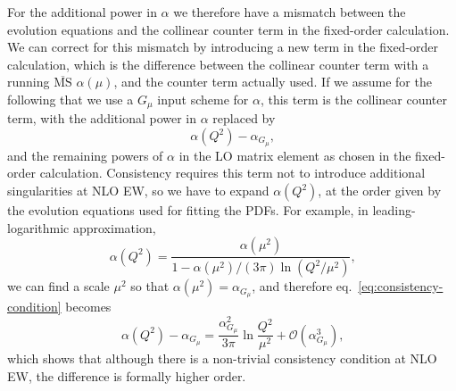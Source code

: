 For the additional power in $\alpha$ we therefore have a mismatch between the evolution equations and the collinear counter term in the fixed-order calculation.
We can correct for this mismatch by introducing a new term in the fixed-order calculation, which is the difference between the collinear counter term with a running $\overline{\mathrm{MS}}$ $\alpha (\mu)$, and the counter term actually used.
If we assume for the following that we use a $G_\mu$ input scheme for $\alpha$, this term is the collinear counter term, with the additional power in $\alpha$ replaced by
\begin{equation}
\alpha (Q^2) - \alpha_{G_\mu} \text{,} \label{eq:consistency-condition}
\end{equation}
and the remaining powers of $\alpha$ in the LO matrix element as chosen in the fixed-order calculation.
Consistency requires this term not to introduce additional singularities at NLO EW, so we have to expand $\alpha (Q^2)$, at the order given by the evolution equations used for fitting the PDFs.
For example, in leading-logarithmic approximation,
\begin{equation}
\alpha (Q^2) = \frac{\alpha (\mu^2)}{1 - \alpha (\mu^2)/(3\pi) \ln (Q^2/\mu^2)} \text{,}
\end{equation}
we can find a scale $\mu^2$ so that $\alpha (\mu^2) = \alpha_{G_\mu}$, and therefore eq.~\eqref{eq:consistency-condition} becomes
\begin{equation}
\alpha (Q^2) - \alpha_{G_\mu} = \frac{\alpha_{G_\mu}^2}{3 \pi} \ln \frac{Q^2}{\mu^2} + \mathcal{O} (\alpha_{G_\mu}^3) \text{,}
\end{equation}
which shows that although there is a non-trivial consistency condition at NLO EW, the difference is formally higher order.

